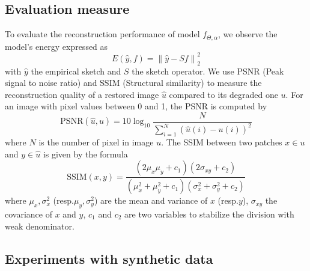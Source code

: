 \documentclass[12pt,a4paper]{article}
\begin{document}
\subsection{Evaluation measure}
To evaluate the reconstruction performance of model $f_{\Theta, \alpha}$, we observe the model's energy expressed as
\begin{equation}
    E(\hat{y}, f) = \left \|\hat{y} - Sf\right\|_2^2
\end{equation}
with $\hat{y}$ the empirical sketch and $S$ the sketch operator.
We use PSNR (Peak signal to noise ratio) and SSIM (Structural similarity) to measure the reconstruction quality of a restored image $\hat{u}$ compared to its degraded one $u$. 
For an image with pixel values between 0 and 1, the PSNR is computed by 
\begin{equation}
    \text{PSNR}(\hat{u},u) = 10 \log_{10}\frac{N}{\sum_{i=1} ^N(\hat{u}(i) - u(i))^2}
\end{equation}
where $N$ is the number of pixel in image $u$. The SSIM between two patches $x \in u$ and $y \in \hat{u}$ is given by the formula
\begin{equation}
    \text{SSIM}(x,y) = \frac{(2\mu_x\mu_y + c_1)(2\sigma_{xy} + c_2)}{(\mu_x^2 + \mu_y^2 + c_1)(\sigma_x^2 + \sigma_y^2 + c_2)}
\end{equation}
where $\mu_x, \sigma_x^2$ (resp.$\mu_y, \sigma_y^2$) are the mean and variance of $x$ (resp.$y$), $\sigma_{xy}$ the covariance of $x$ and $y$, $c_1$ and $c_2$ are two variables to stabilize the division with weak denominator. 

\subsection{Experiments with synthetic data}\label{Section:syn data}
\end{document}
